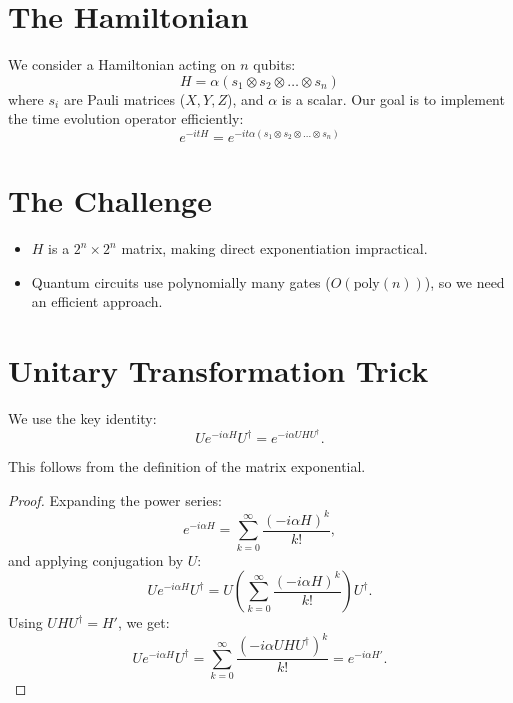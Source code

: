 \documentclass{article}
\begin{document}
\section{The Hamiltonian}
We consider a Hamiltonian acting on $n$ qubits:
\begin{equation}
  H = \alpha (s_1 \otimes s_2 \otimes \dots \otimes s_n)
\end{equation}
where $s_i$ are Pauli matrices ($X, Y, Z$), and $\alpha$ is a scalar. Our goal is to implement the time evolution operator efficiently:
\begin{equation}
  e^{-itH} = e^{-it\alpha (s_1 \otimes s_2 \otimes \dots \otimes s_n)}
\end{equation}

\section{The Challenge}
\begin{itemize}
\item $H$ is a $2^n \times 2^n$ matrix, making direct exponentiation impractical.
\item Quantum circuits use polynomially many gates ($O(\text{poly}(n))$), so we need an efficient approach.
\end{itemize}

\section{Unitary Transformation Trick}
We use the key identity:
\begin{equation}
  U e^{-i\alpha H} U^\dagger = e^{-i\alpha UHU^\dagger}.
\end{equation}

This follows from the definition of the matrix exponential.

\begin{proof}
  Expanding the power series:
  \begin{equation}
    e^{-i\alpha H} = \sum_{k=0}^{\infty} \frac{(-i\alpha H)^k}{k!},
  \end{equation}
  and applying conjugation by $U$:
  \begin{equation}
    U e^{-i\alpha H} U^\dagger = U \left( \sum_{k=0}^{\infty} \frac{(-i\alpha H)^k}{k!} \right) U^\dagger.
  \end{equation}
  Using $UHU^\dagger = H'$, we get:
  \begin{equation}
    U e^{-i\alpha H} U^\dagger = \sum_{k=0}^{\infty} \frac{(-i\alpha UHU^\dagger)^k}{k!} = e^{-i\alpha H'}.
  \end{equation}
  
\end{proof}
\end{document}
